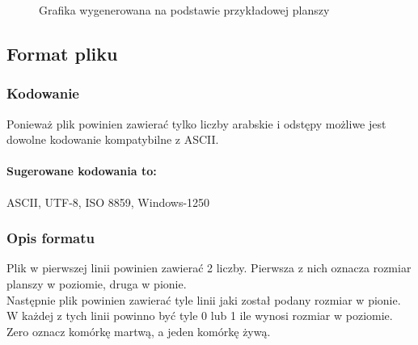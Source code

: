 \documentclass{report}
\begin{document}
\begin{figure}[h]
\centering
\setlength{\fboxsep}{0pt} %
\setlength{\fboxrule}{1pt} %
\caption{Grafika wygenerowana na podstawie przykładowej planszy}
\end{figure}



\subsection{Format pliku}
\subsubsection*{Kodowanie}
Ponieważ plik powinien zawierać tylko liczby arabskie i odstępy możliwe jest dowolne kodowanie kompatybilne z ASCII. \\
\paragraph{Sugerowane kodowania to:}
ASCII, UTF-8, ISO 8859, Windows-1250

\subsubsection*{Opis formatu}
Plik w pierwszej linii powinien zawierać 2 liczby. Pierwsza z nich oznacza rozmiar planszy w poziomie, druga w pionie. \\
Następnie plik powinien zawierać tyle linii jaki został podany rozmiar w pionie. W każdej z tych linii powinno być tyle 0 lub 1 ile wynosi rozmiar w poziomie. \\
Zero oznacz komórkę martwą, a jeden komórkę żywą.
\end{document}
